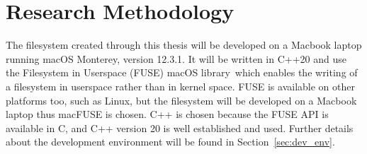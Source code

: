 
\section{Research Methodology}%

The filesystem created through this thesis will be developed on a Macbook laptop running macOS Monterey, version 12.3.1. It will be written in C++20 and use the Filesystem in Userspace (FUSE) macOS library\,\cite{HomeMacFUSE} which enables the writing of a filesystem in userspace rather than in kernel space. FUSE is available on other platforms too, such as Linux, but the filesystem will be developed on a Macbook laptop thus macFUSE is chosen. C++ is chosen because the FUSE API is available in C, and C++ version 20 is well established and used. Further details about the development environment will be found in Section~\ref{sec:dev_env}.

